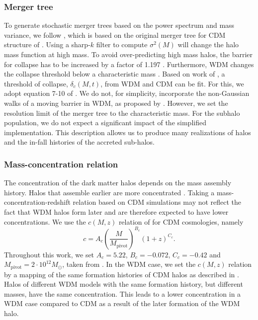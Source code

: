 \documentclass[a4paper,11pt]{article}
\begin{document}
\subsubsection{Merger tree}
To generate stochastic merger trees based on the power spectrum and mass variance, we follow \cite{Benson:2013p13572}, which is based on the original merger tree for CDM structure of \cite{Parkinson:2008p31}. Using a sharp-$k$ filter to compute $\sigma^2(M)$ will change the halo mass function at high mass. To avoid over-predicting high mass halos, the barrier for collapse has to be increased by a factor of 1.197 \citep[see][]{Benson:2013p13572}.
Furthermore, WDM changes the collapse threshold below a characteristic mass \cite{Barkana:2001p14092}. Based on work of \cite{Barkana:2001p14092, Benson:2013p13572}, a threshold of collapse, $\delta_c(M,t)$, from WDM and CDM can be fit. 
For this, we adopt equation 7-10 of \cite{Barkana:2001p14092}. We do not, for simplicity, incorporate the non-Gaussian walks of a moving barrier in WDM, as proposed by \cite{Benson:2013p13572}. However, we set the resolution limit of the merger tree to the characteristic mass. For the subhalo population, we do not expect a significant impact of the simplified implementation. This description allows us to produce many realizations of halos and the in-fall histories of the accreted sub-halos.



\subsubsection{Mass-concentration relation}
The concentration of the dark matter halos depends on the mass assembly history. Halos that assemble earlier are more concentrated \citep[e.g.][]{Navarro:1997p8389, Wechsler:2002p14192, Ludlow:2013p2973}. Taking a mass-concentration-redshift relation based on CDM simulations may not reflect the fact that WDM halos form later and are therefore expected to have lower concentrations. We use the $c(M,z)$ relation of \cite{Duffy:2008p14292} for CDM cosmologies, namely 
\begin{equation}
	c = A_c\left(\frac{M}{M_{\text{pivot}}}\right)^{B_c}(1+z)^{C_c}.
\end{equation}
Throughout this work, we set $A_c = 5.22$, $B_c = -0.072$, $C_c = -0.42$ and $M_{\text{pivot}} = 2 \cdot 10^{12} M_{\odot}$, taken from \cite{Duffy:2008p14292}. In the WDM case, we set the $c(M,z)$ relation by a mapping of the same formation histories of CDM halos as described in \cite{Schneider:2015p14276}. Halos of different WDM models with the same formation history, but different masses, have the same concentration. This leads to a lower concentration in a WDM case compared to CDM as a result of the later formation of the WDM halo.
\end{document}
